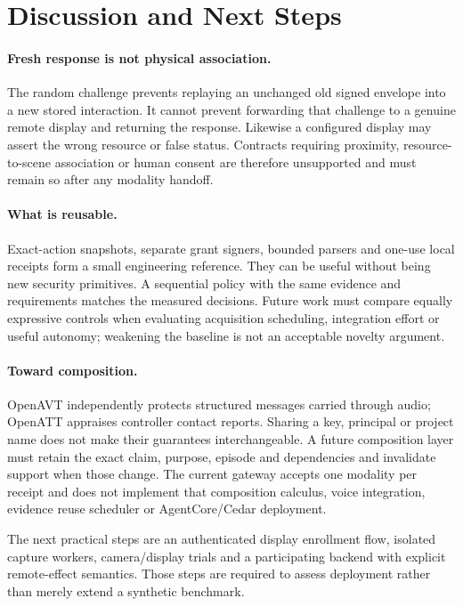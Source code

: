 \section{Discussion and Next Steps}
\paragraph{Fresh response is not physical association.}
The random challenge prevents replaying an unchanged old signed envelope into a
new stored interaction. It cannot prevent forwarding that challenge to a genuine
remote display and returning the response. Likewise a configured display may
assert the wrong resource or false status. Contracts requiring proximity,
resource-to-scene association or human consent are therefore unsupported and
must remain so after any modality handoff.

\paragraph{What is reusable.}
Exact-action snapshots, separate grant signers, bounded parsers and one-use local
receipts form a small engineering reference. They can be useful without being
new security primitives. A sequential policy with the same evidence and
requirements matches the measured decisions. Future work must compare equally
expressive controls when evaluating acquisition scheduling, integration effort
or useful autonomy; weakening the baseline is not an acceptable novelty argument.

\paragraph{Toward composition.}
OpenAVT independently protects structured messages carried through audio;
OpenATT appraises controller contact reports. Sharing a key, principal or project
name does not make their guarantees interchangeable. A future composition layer
must retain the exact claim, purpose, episode and dependencies and invalidate
support when those change. The current gateway accepts one modality per receipt
and does not implement that composition calculus, voice integration, evidence
reuse scheduler or AgentCore/Cedar deployment.

The next practical steps are an authenticated display enrollment flow, isolated
capture workers, camera/display trials and a participating backend with explicit
remote-effect semantics. Those steps are required to assess deployment rather
than merely extend a synthetic benchmark.

